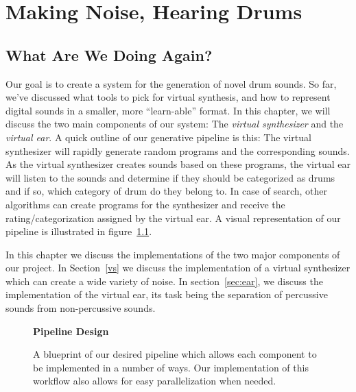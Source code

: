 \documentclass[\main/thesis.tex]{subfiles}
\begin{document}
\chapter{Making Noise, Hearing Drums}
\label{implementation}


\section{What Are We Doing Again?}
Our goal is to create a system for the generation of novel drum sounds. So far, we've discussed what tools to pick for virtual synthesis, and how to represent digital sounds in a smaller, more \enquote{learn-able} format. In this chapter, we will discuss the two main components of our system: The \textit{virtual synthesizer} and the \textit{virtual ear}. A quick outline of our generative pipeline is this: The virtual synthesizer will rapidly generate random programs and the corresponding sounds. As the virtual synthesizer creates sounds based on these programs, the virtual ear will listen to the sounds and determine if they should be categorized as drums and if so, which category of drum do they belong to. In case of search, other algorithms can create programs for the synthesizer and receive the rating/categorization assigned by the virtual ear. A visual representation of our pipeline is illustrated in  figure~\ref{fig:pipeline_outline}.

In this chapter we discuss the implementations of the two major components of our project. In Section~\ref{vs} we discuss the implementation of a virtual synthesizer which can create a wide variety of noise. In section~\ref{sec:ear}, we discuss the implementation of the virtual ear, its task being the separation of percussive sounds from non-percussive sounds.


 \begin{figure}[t!]
    \begin{center}
    \textbf{Pipeline Design}
    \end{center}
    \caption{A blueprint of our desired pipeline which allows each component to be implemented in a number of ways. Our implementation of this workflow also allows for easy parallelization when needed.
    }
\label{fig:pipeline_outline}
\end{figure}
\end{document}
